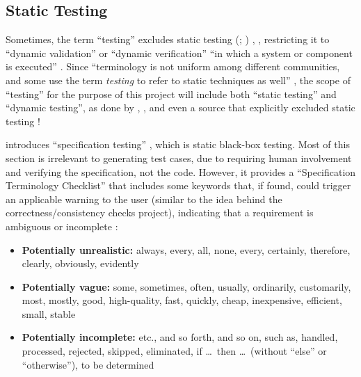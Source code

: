 \ifnotpaper
    \subsection{Static Testing}
    \label{static-test}
    Sometimes, the term ``testing'' excludes static testing
    \ifnotpaper
        (\citealp[p.~222]{AmmannAndOffutt2017}; \citealp[p.~13]{Firesmith2015})%
    \else
        \cite[p.~222]{AmmannAndOffutt2017}, \cite[p.~13]{Firesmith2015}%
    \fi, restricting it to ``dynamic validation'' \citep[p.~5-1]{SWEBOK2024} or
    ``dynamic verification'' ``in which a system or component is
    executed'' \citep[p.~427]{IEEE2017}. Since ``terminology is not uniform
    among different communities, and some use the term \emph{testing} to refer to
    static techniques as well''
    \citep[p.~5-2]{SWEBOK2024}, the scope of ``testing'' for the purpose of this
    project will include both ``static testing'' and ``dynamic testing'', as
    done by \citet[p.~17]{IEEE2022}, \citet[pp.~8-9]{Gerrard2000a}, and even a
    source that explicitly excluded static testing \citep[p.~440]{IEEE2017}!

    \citeauthor{Patton2006} introduces ``specification testing''
    \citeyearpar[pp.~56-62]{Patton2006}, which is static black-box testing.
    Most of this section is irrelevant to generating test cases, due to
    requiring human involvement and verifying the specification, not the code.
    However, it provides a ``Specification Terminology Checklist''
    \citep[p.~61]{Patton2006} that includes some keywords that, if found, could
    trigger an applicable warning to the user (similar to the idea behind the
    correctness/consistency checks project), indicating that a requirement is
    ambiguous or incomplete \citep[see][p.~1-8]{SWEBOK2024}:

    \begin{itemize}
        \item \textbf{Potentially unrealistic:} always, every, all, none, every,
              certainly, therefore, clearly, obviously, evidently
        \item \textbf{Potentially vague:} some, sometimes, often, usually,
              ordinarily, customarily, most, mostly, good, high-quality, fast,
              quickly, cheap, inexpensive, efficient, small, stable
        \item \textbf{Potentially incomplete:} etc., and so forth, and so on,
              such as, handled, processed, rejected, skipped, eliminated,
              if \dots\ then \dots\ (without ``else'' or ``otherwise''),
              to be determined \citep[p.~408]{vanVliet2000}
    \end{itemize}

